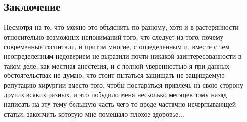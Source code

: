 \documentclass[14pt, a4paper, russian]{report}
\begin{document}
\begin{normalsize}
\chapter*{Заключение}
Несмотря на то, что можно это объяснить по-разному, хотя и в растерянности относительно возможных непониманий того, что следует из того, почему современные госпитали, и притом многие, с определенным и, вместе с тем неопределенным недоверием не выразили почти никакой заинтересованности в таком деле, как местная анестезия, и с полной уверенностью я при данных обстоятельствах не думаю, что стоит пытаться защищать не защищаемую репутацию хирургии вместо того, чтобы постараться привлечь на свою сторону других всяких разных, и это побудило меня несколько месяцев тому назад написать на эту тему большую часть чего-то вроде частично исчерпывающей статьи, закончить которую мне помешало плохое здоровье...
\newpage


\end{normalsize}
\end{document}
